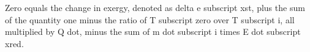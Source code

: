 Zero equals the change in exergy, denoted as delta e subscript xst, plus the sum of the quantity one minus the ratio of T subscript zero over T subscript i, all multiplied by Q dot, minus the sum of m dot subscript i times E dot subscript xred.